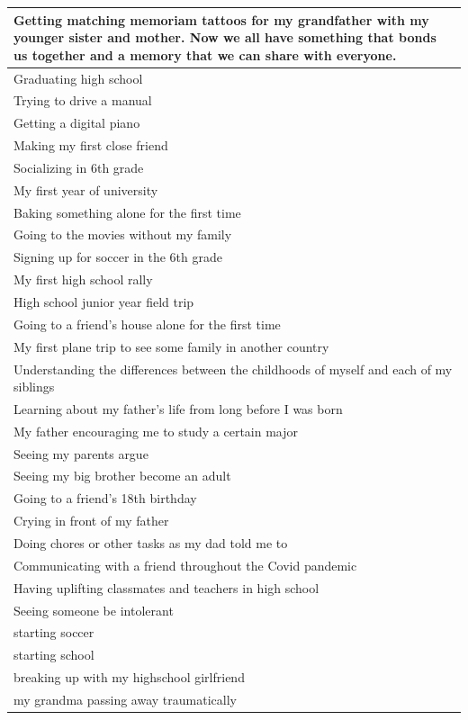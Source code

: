 \documentclass[
  .7em,
  letterpaper,
  DIV=11,
  numbers=noendperiod]{scrartcl}
\begin{document}
\begin{table}
\begin{tabular}{l}
\hline
Getting matching memoriam tattoos for my grandfather with my younger sister and mother. Now we all have something that bonds us together and a memory that we can share with everyone.\\
\hline
Graduating high school\\
\hline
Trying to drive a manual\\
\hline
Getting a digital piano\\
\hline
Making my first close friend\\
\hline
Socializing in 6th grade\\
\hline
My first year of university\\
\hline
Baking something alone for the first time\\
\hline
Going to the movies without my family\\
\hline
Signing up for soccer in the 6th grade\\
\hline
My first high school rally\\
\hline
High school junior year field trip\\
\hline
Going to a friend's house alone for the first time\\
\hline
My first plane trip to see some family in another country\\
\hline
Understanding the differences between the childhoods of myself and each of my siblings\\
\hline
Learning about my father's life from long before I was born\\
\hline
My father encouraging me to study a certain major\\
\hline
Seeing my parents argue\\
\hline
Seeing my big brother become an adult\\
\hline
Going to a friend's 18th birthday\\
\hline
Crying in front of my father\\
\hline
Doing chores or other tasks as my dad told me to\\
\hline
Communicating with a friend throughout the Covid pandemic\\
\hline
Having uplifting classmates and teachers in high school\\
\hline
Seeing someone be intolerant\\
\hline
starting soccer\\
\hline
starting school\\
\hline
breaking up with my highschool girlfriend\\
\hline
my grandma passing away traumatically\\

\end{tabular}
\end{table}
\end{document}
